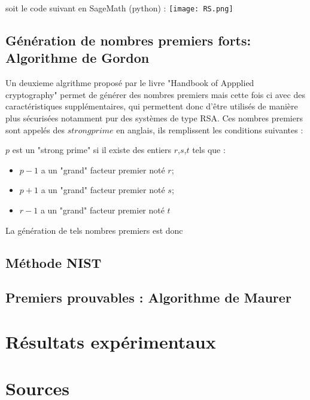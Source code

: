 \documentclass[a4paper,11pt]{article}
\begin{document}
soit le code suivant en SageMath (python) :
\newline
\texttt{[image: RS.png]}

\subsection{Génération de nombres premiers forts: Algorithme de Gordon}

Un deuxieme algrithme proposé par le livre "Handbook of Appplied cryptography" permet de générer des nombres premiers mais cette fois ci avec des caractéristiques supplémentaires, qui permettent donc d'être utilisés de manière plus sécurisées notamment pur des systèmes de type RSA.
Ces nombres premiers sont appelés des $strong prime$ en anglais, ils remplissent les conditions suivantes : \newline

$p$ est un "strong prime" si il existe des entiers $r$,$s$,$t$ tels que :
\begin{itemize}
\item $p-1$ a un "grand" facteur premier noté $r$;
\item $p+1$ a un "grand" facteur premier noté $s$;
\item $r-1$ a un "grand" facteur premier noté $t$
\end{itemize}

La génération de tels nombres premiers est donc 

\subsection{Méthode NIST}

\subsection{Premiers prouvables : Algorithme de Maurer}

\section{Résultats expérimentaux}

\section*{Sources}




 
  
\end{document}
